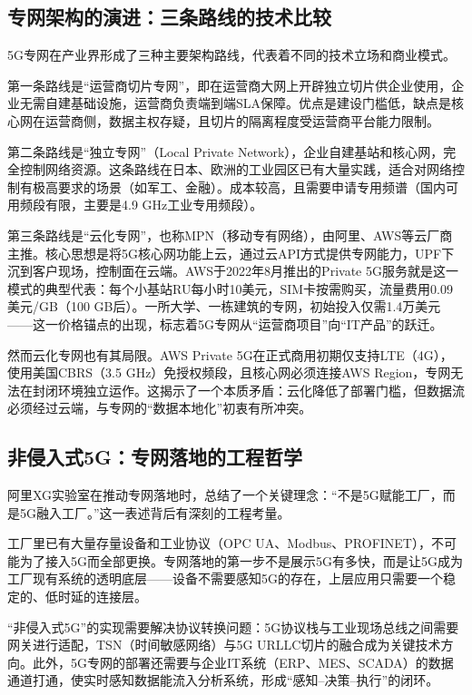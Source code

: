 \subsection{专网架构的演进：三条路线的技术比较}

5G专网在产业界形成了三种主要架构路线，代表着不同的技术立场和商业模式。

第一条路线是``运营商切片专网''，即在运营商大网上开辟独立切片供企业使用，企业无需自建基础设施，运营商负责端到端SLA保障。优点是建设门槛低，缺点是核心网在运营商侧，数据主权存疑，且切片的隔离程度受运营商平台能力限制。

第二条路线是``独立专网''（Local Private Network），企业自建基站和核心网，完全控制网络资源。这条路线在日本、欧洲的工业园区已有大量实践，适合对网络控制有极高要求的场景（如军工、金融）。成本较高，且需要申请专用频谱（国内可用频段有限，主要是4.9 GHz工业专用频段）。

第三条路线是``云化专网''，也称MPN（移动专有网络），由阿里、AWS等云厂商主推。核心思想是将5G核心网功能上云，通过云API方式提供专网能力，UPF下沉到客户现场，控制面在云端。AWS于2022年8月推出的Private 5G服务就是这一模式的典型代表：每个小基站RU每小时10美元，SIM卡按需购买，流量费用0.09美元/GB（100 GB后）。一所大学、一栋建筑的专网，初始投入仅需1.4万美元——这一价格锚点的出现，标志着5G专网从``运营商项目''向``IT产品''的跃迁。

然而云化专网也有其局限。AWS Private 5G在正式商用初期仅支持LTE（4G），使用美国CBRS（3.5 GHz）免授权频段，且核心网必须连接AWS Region，专网无法在封闭环境独立运作。这揭示了一个本质矛盾：云化降低了部署门槛，但数据流必须经过云端，与专网的``数据本地化''初衷有所冲突。

\subsection{非侵入式5G：专网落地的工程哲学}

阿里XG实验室在推动专网落地时，总结了一个关键理念：``不是5G赋能工厂，而是5G融入工厂。''这一表述背后有深刻的工程考量。

工厂里已有大量存量设备和工业协议（OPC UA、Modbus、PROFINET），不可能为了接入5G而全部更换。专网落地的第一步不是展示5G有多快，而是让5G成为工厂现有系统的透明底层——设备不需要感知5G的存在，上层应用只需要一个稳定的、低时延的连接层。

``非侵入式5G''的实现需要解决协议转换问题：5G协议栈与工业现场总线之间需要网关进行适配，TSN（时间敏感网络）与5G URLLC切片的融合成为关键技术方向。此外，5G专网的部署还需要与企业IT系统（ERP、MES、SCADA）的数据通道打通，使实时感知数据能流入分析系统，形成``感知--决策--执行''的闭环。

